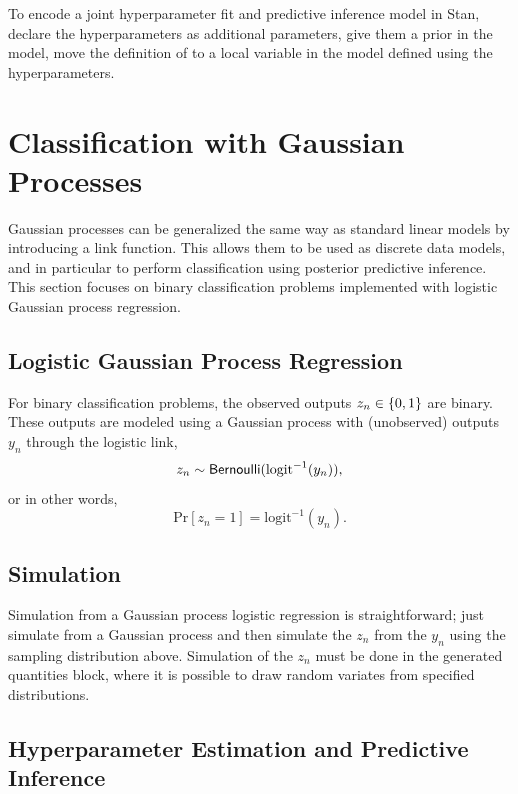 To encode a joint hyperparameter fit and predictive inference model in
Stan, declare the hyperparameters as additional parameters,
give them a prior in the model, move the definition of  to
a local variable in the model defined using the hyperparameters.

\section{Classification with Gaussian Processes}

Gaussian processes can be generalized the same way as standard linear
models by introducing a link function.  This allows them to be used as
discrete data models, and in particular to perform classification
using posterior predictive inference.  This section focuses on binary
classification problems implemented with logistic Gaussian process
regression.  

\subsection{Logistic Gaussian Process Regression}

For binary classification problems, the observed outputs $z_n \in
\setlist{0,1}$ are binary.  These outputs are modeled using a Gaussian
process with (unobserved) outputs $y_n$ through the logistic link,
\[
z_n \sim \distro{Bernoulli}(\mbox{logit}^{-1}(y_n)),
\]
or in other words,
\[
\mbox{Pr}[z_n = 1] = \mbox{logit}^{-1}(y_n).
\]

\subsection{Simulation}

Simulation from a Gaussian process logistic regression is
straightforward; just simulate from a Gaussian process and then
simulate the $z_n$ from the $y_n$ using the sampling distribution
above.  Simulation of the $z_n$ must be done in the generated
quantities block, where it is possible to draw random variates from
specified distributions.


\subsection{Hyperparameter Estimation and Predictive Inference}


